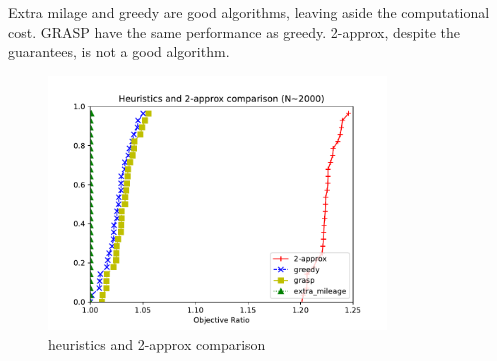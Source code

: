 \begin{claim}
    Extra milage and greedy are good algorithms, leaving aside the computational
    cost. GRASP have the same performance as greedy. 2-approx, despite the
    guarantees, is not a good algorithm.
\end{claim}

\begin{figure}[h]
    \centering
    \includegraphics[width=0.8\textwidth]{figures/heuristic_firstcomp}
    \caption{heuristics and 2-approx comparison}
\end{figure}

